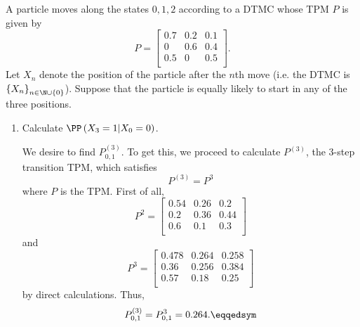 \documentclass[stat333]{subfiles}
\begin{document}
    \ex A particle moves along the states $0,1,2$ according to a DTMC whose TPM $P$ is given by
    \begin{equation*}
        P = 
        \begin{bmatrix}
        	0.7 & 0.2 & 0.1 \\
        	0 & 0.6 & 0.4 \\
        	0.5 & 0 & 0.5 \\
        \end{bmatrix}.
    \end{equation*}
    Let $X_n$ denote the position of the particle after the $n$th move (i.e. the DTMC is $\left\lbrace X_n \right\rbrace^{}_{n\in\N\cup\left\lbrace 0 \right\rbrace}$). Suppose that the particle is equally likely to start in any of the three positions.
    \begin{enumerate}
        \item Calculate $\PP\left( X_3=1|X_0=0 \right)$.

            \begin{subproof}[Answer]
                We desire to find $P_{0,1}^{\left( 3 \right)}$. To get this, we proceed to calculate $P^{\left( 3 \right)}$, the $3$-step transition TPM, which satisfies
                \begin{equation*}
                    P^{\left( 3 \right)} = P^3
                \end{equation*}
                where $P$ is the TPM. First of all,
                \begin{equation*}
                    P^2 = 
                    \begin{bmatrix}
                    	0.54 & 0.26 & 0.2 \\
                    	0.2 & 0.36 & 0.44 \\
                    	0.6 & 0.1 & 0.3 \\
                    \end{bmatrix}
                \end{equation*}
                and
                \begin{equation*}
                    P^3 = 
                    \begin{bmatrix}
                    	0.478 & 0.264 & 0.258 \\
                    	0.36 & 0.256 & 0.384 \\
                    	0.57 & 0.18 & 0.25 \\
                    \end{bmatrix}
                \end{equation*}
                by direct calculations. Thus,
                \begin{equation*}
                    P_{0,1}^{\left( 3 \right)} = P_{0,1}^3 = 0.264. \eqqedsym
                \end{equation*}
            \end{subproof}


\end{enumerate}
\end{document}
